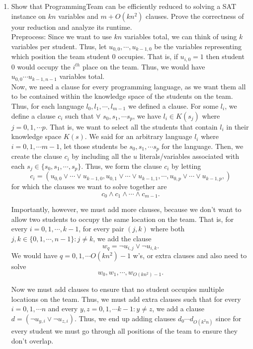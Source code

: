 \documentclass[11pt]{article}
\begin{document}
\begin{enumerate}
\begin{enumerate}
    \item 
Show that ProgrammingTeam can be efficiently reduced to solving a SAT instance on $kn$ variables and $m+O(kn^2)$ clauses.  Prove the correctness of your reduction and analyze its runtime.\\

Preprocess:
Since we want to use $kn$ variables total, we can think of using $k$ variables per student. Thus, let $u_{0, 0}, \cdots, u_{k-1, 0}$ be the variables representing which position the team student $0$ occupies. That is, if $u_{i, 0} = 1$ then student $0$ would occupy the $i^{th}$ place on the team. Thus, we would have $u_{0, 0} \cdots u_{k-1, n-1}$ variables total. \\

Now, we need a clause for every programming language, as we want them all to be contained within the knowledge space of the students on the team. Thus, for each language $l_0, l_1, \cdots, l_{m-1}$ we defined a clause. For some $l_i$, we define a clause $c_i$ such that $\forall$ $s_0, s_1, \cdots s_p$, we have $l_i \in K(s_j)$ where $j=0, 1, \cdots p$. That is, we want to select all the students that contain $l_i$ in their knowledge space $K(s)$. We said for an arbitrary language $l_i$ where $i=0, 1, \cdots m-1$, let those students be $s_0, s_1, \cdots s_p$ for the language. Then, we create the clause $c_i$ by including all the $u$ literals/variables associated with each $s_j \in \{s_0, s_1, \cdots, s_p\}$. Thus, we form the clause $c_i$ by letting 
$$
c_i = (u_{0, 0} \vee \cdots \vee u_{k-1, 0}, u_{0, 1} \vee \cdots \vee u_{k-1, 1}, \cdots, u_{0, p} \vee \cdots \vee u_{k-1, p},)
$$
for which the clauses we want to solve together are 
$$
c_0 \wedge c_1 \wedge \cdots \wedge c_{m-1}.
$$

Importantly, however, we must add more clauses, because we don't want to allow two students to occupy the same location on the team. That is, for every $i=0, 1, \cdots, k-1$, for every pair $(j, k)$ where both $j, k \in \{0, 1, \cdots, n-1\} : j \neq k$, we add the clause 
$$w_q = \neg u_{i, j} \vee \neg u_{i, k}.$$
We would have $q = 0, 1, \cdots O(kn^2) - 1$ w's, or extra clauses and also need to solve
$$w_0, w_1, \cdots, w_{O(kn^2) - 1}.$$ 

Now we must add clauses to ensure that no student occupies multiple locations on the team. Thus, we must add extra clauses such that for every $i=0, 1, \cdots n$ and every $y, z = 0, 1, \cdots k-1 : y \neq z$, we add a clause $d = (\neg u_{y, i} \vee \neg u_{z, i})$. Thus, we end up adding clauses $d_0 \cdots d_{O(k^2n)}$ since for every student we must go through all positions of the team to ensure they don't overlap. 


\end{enumerate}
\end{enumerate}
\end{document}
